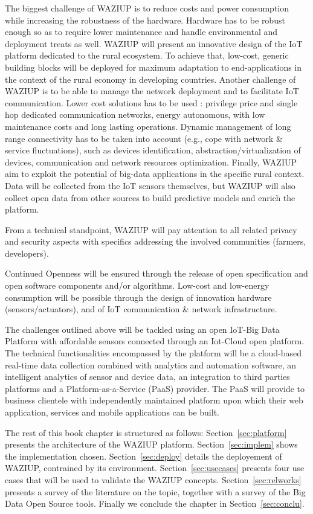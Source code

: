 The biggest challenge of WAZIUP is to reduce costs and power consumption while increasing the robustness of the hardware.
Hardware has to be robust enough so as to require lower maintenance and handle environmental and deployment treats as well.
WAZIUP will present an innovative design of the IoT platform dedicated to the rural ecosystem.
To achieve that, low-cost, generic building blocks will be deployed for maximum adaptation to end-applications in the context of the rural economy in developing countries.
Another challenge of WAZIUP is to be able to manage the network deployment and to facilitate IoT communication.
Lower cost solutions has to be used : privilege price and single hop dedicated communication networks, energy autonomous, with low maintenance costs and long lasting operations.
Dynamic management of long range connectivity has to be taken into account (e.g., cope with network \& service fluctuations), such as devices identification, abstraction/virtualization of devices, communication and network resources optimization.
Finally, WAZIUP aim to exploit the potential of big-data applications in the specific rural context.
Data will be collected from the IoT sensors themselves, but WAZIUP will also collect open data from other sources to build predictive models and enrich the platform.

From a technical standpoint, WAZIUP will pay attention to all related privacy and security aspects with specifics addressing the involved communities (farmers, developers).

Continued Openness will be ensured through the release of open specification and open software components and/or algorithms.
Low-cost and low-energy consumption will be possible through the design of innovation hardware (sensors/actuators), and of IoT communication \& network infrastructure.

The challenges outlined above will be tackled using an open IoT-Big Data Platform with affordable sensors connected through an Iot-Cloud open platform. 
The technical functionalities encompassed by the platform will be a cloud-based real-time data collection combined with analytics and automation software, an intelligent analytics of sensor and device data, an integration to third parties platforms and a Platform-as-a-Service (PaaS) provider. 
The PaaS will provide to business clientele with independently maintained platform upon which their web application, services and mobile applications can be built. 

The rest of this book chapter is structured as follows: Section~\ref{sec:platform} presents the architecture of the WAZIUP platform. 
Section~\ref{sec:implem} shows the implementation chosen. 
Section~\ref{sec:deploy} details the deployement of WAZIUP, contrained by its environment.
Section~\ref{sec:usecases} presents four use cases that will be used to validate the WAZIUP concepts.
Section~\ref{sec:relworks} presents a survey of the literature on the topic, together with a survey of the Big Data Open Source tools.
Finally we conclude the chapter in Section~\ref{sec:conclu}.
